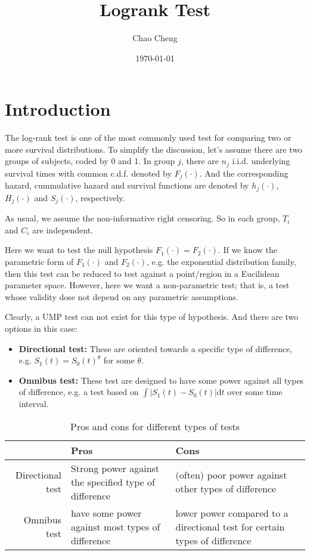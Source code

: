 \documentclass[a4paper,12pt]{article}
\title{Logrank Test}
\author{Chao Cheng}
\date{\today}
\begin{document}
\maketitle
\tableofcontents{}

\section{Introduction}
\label{sec:introduction}

The log-rank test is one of the most commonly used test for comparing two or more survival distributions. To simplify the discussion, let's assume there are two groups of subjects, coded by 0 and 1. In group $j$, there are $n_j$ i.i.d. underlying survival times with common c.d.f. denoted by $F_j\left(\cdot\right)$. And the corresponding hazard, cummulative hazard and survival functions are denoted by $h_j\left(\cdot\right)$, $H_j\left(\cdot\right)$ and $S_j\left(\cdot\right)$, respectively.
\par
As usual, we assume the {\color{red} non-informative right censoring}. So in each group, $T_i$ and $C_i$ are independent.
\par
Here we want to test the null hypothesis $F_1\left(\cdot\right) = F_2\left(\cdot\right)$. If we know the parametric form of $F_1\left(\cdot\right)$ and $F_2\left(\cdot\right)$, e.g. the exponential distribution family, then this test can be reduced to test against a point/region in a Eucilidean parameter space. However, here we want a non-parametric test; that is, a test whose validity dose not depend on any parametric assumptions.
\par
Clearly, a UMP test can not exist for this type of hypothesis. And there are two options in this case:
\begin{itemize}
\item \textbf{Directional test: }These are oriented towards a specific type of difference, e.g. $S_1\left(t\right) = S_0\left(t\right)^\theta$ for some $\theta$.
\item \textbf{Omnibus test: }These test are designed to have some power against all types of difference, e.g. a test based on $\int\left|S_1\left(t\right) - S_0\left(t\right)\right|\mathrm{d}t$ over some time interval.
\end{itemize}

\begin{table}[htbp]
  \centering
  \begin{tabular}{|r|p{4cm}|p{4cm}|}
    \hline
    & Pros & Cons    \\
    \hline
    Directional test &
                       Strong power against the specified type of difference &
    (often) poor power against other types of difference    \\
    \hline
    Omnibus test & have some power against most types of difference &
    lower power compared to a directional test for certain types of difference \\
    \hline
  \end{tabular}
  \caption{Pros and cons for different types of tests}
  \label{tab:pros_and_cons}
\end{table}
\end{document}
